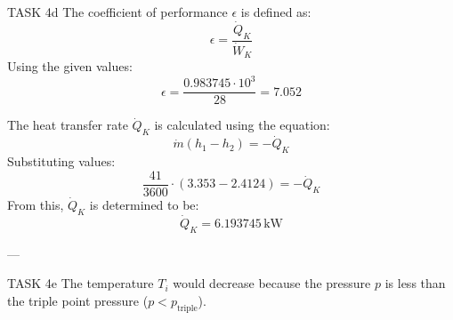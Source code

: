 TASK 4d  
The coefficient of performance \( \epsilon \) is defined as:  
\[
\epsilon = \frac{\dot{Q}_K}{\dot{W}_K}
\]  
Using the given values:  
\[
\epsilon = \frac{0.983745 \cdot 10^3}{28} = 7.052
\]  

The heat transfer rate \( \dot{Q}_K \) is calculated using the equation:  
\[
\dot{m} (h_1 - h_2) = -\dot{Q}_K
\]  
Substituting values:  
\[
\frac{41}{3600} \cdot (3.353 - 2.4124) = -\dot{Q}_K
\]  
From this, \( \dot{Q}_K \) is determined to be:  
\[
\dot{Q}_K = 6.193745 \, \text{kW}
\]  

---

TASK 4e  
The temperature \( T_i \) would decrease because the pressure \( p \) is less than the triple point pressure (\( p < p_{\text{triple}} \)).